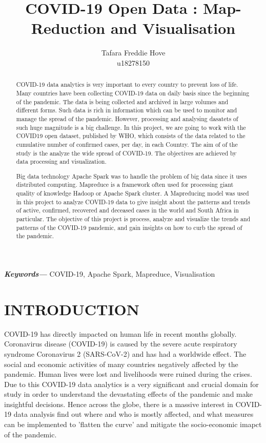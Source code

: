 \documentclass[12pt,letterpaper, twoside]{article}
\title{COVID-19 Open Data : Map-Reduction and Visualisation}
\author{Tafara Freddie Hove \\
        \small u18278150 \\
}
\date{}
\providecommand{\keywords}[1]
{
  \small	
  \textbf{\textit{Keywords---}} #1 
}
\begin{document}
\maketitle
\begin{abstract}
COVID-19 data analytics is very important to every country to prevent loss of life. Many countries have been collecting COVID-19 data  on daily basis since the beginning of the pandemic. The data is being collected and archived in large volumes and different forms. Such data is rich in information which can be used to monitor and manage the spread of the pandemic. However, processing and analysing dasatets of such huge magnitude is a big challenge. In this project, we are going to work with the COVID19 open dataset, published by WHO, which consists of the data related to the cumulative number of confirmed cases, per day, in each Country. The aim of of the study is the analyze the wide spread of COVID-19. The objectives are achieved by data processing and visualization. 

Big data technology Apache Spark was to handle the problem of big data since it uses distributed computing. Mapreduce is a framework often used for processing giant quality of knowledge Hadoop or Apache Spark cluster. A Mapreducing model was used in this project to analyze COVID-19 data to give insight about the patterns and trends of active, confirmed, recovered and deceased cases in the world and South Africa in particular. The objective of this project is process, analyze and visualize the trends and patterns of the COVID-19 pandemic, and gain insights on how to curb the spread of the pandemic.

\end{abstract}\hspace{10pt}
\keywords{COVID-19, Apache Spark, Mapreduce, Visualisation}

\section{INTRODUCTION}
COVID-19 has directly impacted on human life in recent months globally. Coronavirus disease (COVID-19) is caused by the severe acute respiratory syndrome Coronavirus 2 (SARS-CoV-2) and has had a worldwide effect. The social and economic activities of many countries negatively affected by the pandemic. Human lives were lost and livelihoods were ruined during the crises.  Due to this COVID-19 data analytics is a very significant and crucial domain for study in order to understand the devastating effects of the pandemic and make insightful decisions. Hence across the globe, there is a massive interest in COVID-19 data analysis find out where and who is mostly affected, and what measures can be implemented to 'flatten the curve' and mitigate the socio-economic imapct of the pandemic. 
\end{document}
